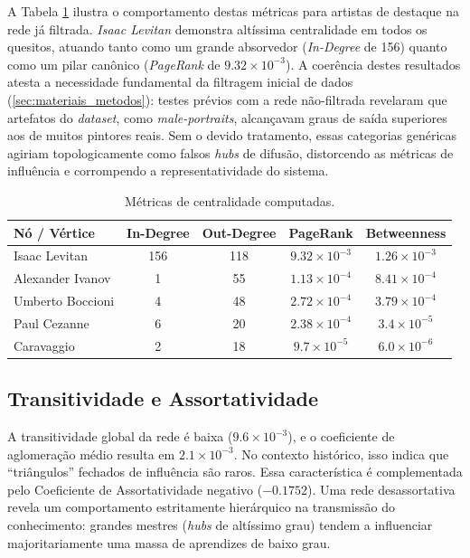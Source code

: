 \documentclass[12pt,a4paper]{article}
\begin{document}
A Tabela \ref{tab:centralidades} ilustra o comportamento destas métricas para artistas de destaque na rede já filtrada. \textit{Isaac Levitan} demonstra altíssima centralidade em todos os quesitos, atuando tanto como um grande absorvedor (\textit{In-Degree} de 156) quanto como um pilar canônico (\textit{PageRank} de $9.32 \times 10^{-3}$). A coerência destes resultados atesta a necessidade fundamental da filtragem inicial de dados (\autoref{sec:materiais_metodos}): testes prévios com a rede não-filtrada revelaram que artefatos do \textit{dataset}, como \textit{male-portraits}, alcançavam graus de saída superiores aos de muitos pintores reais. Sem o devido tratamento, essas categorias genéricas agiriam topologicamente como falsos \textit{hubs} de difusão, distorcendo as métricas de influência e corrompendo a representatividade do sistema.

\begin{table}[htpb]
    \centering
    \caption{Métricas de centralidade computadas.}
    \label{tab:centralidades}
    \begin{tabular}{@{}lcccc@{}}
        \toprule
        \textbf{Nó / Vértice} & \textbf{In-Degree} & \textbf{Out-Degree} & \textbf{PageRank}     & \textbf{Betweenness}  \\ \midrule
        Isaac Levitan         & 156                & 118                 & $9.32 \times 10^{-3}$ & $1.26 \times 10^{-3}$ \\
        Alexander Ivanov      & 1                  & 55                  & $1.13 \times 10^{-4}$ & $8.41 \times 10^{-4}$ \\
        Umberto Boccioni      & 4                  & 48                  & $2.72 \times 10^{-4}$ & $3.79 \times 10^{-4}$ \\
        Paul Cezanne          & 6                  & 20                  & $2.38 \times 10^{-4}$ & $3.4 \times 10^{-5}$  \\
        Caravaggio            & 2                  & 18                  & $9.7 \times 10^{-5}$  & $6.0 \times 10^{-6}$  \\ \bottomrule
    \end{tabular}
\end{table}

\subsection{Transitividade e Assortatividade}
\label{subsec:transitividade}

A transitividade global da rede é baixa ($9.6 \times 10^{-3}$), e o coeficiente de aglomeração médio resulta em $2.1 \times 10^{-3}$. No contexto histórico, isso indica que ``triângulos'' fechados de influência são raros. Essa característica é complementada pelo Coeficiente de Assortatividade negativo ($-0.1752$). Uma rede desassortativa revela um comportamento estritamente hierárquico na transmissão do conhecimento: grandes mestres (\textit{hubs} de altíssimo grau) tendem a influenciar majoritariamente uma massa de aprendizes de baixo grau.
\end{document}
